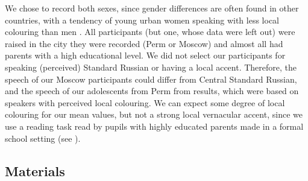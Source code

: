 \documentclass[output=paper,colorlinks,citecolor=black]{langscibook}
\begin{document}
We chose to record both sexes, since gender differences are often found in other countries, with a tendency of young urban women speaking with less local colouring than men \citep{Labov2001}. All participants (but one, whose data were left out) were raised in the city they were recorded (Perm or Moscow) and almost all had parents with a high educational level. We did not select our participants for speaking (perceived) Standard Russian or having a local accent. Therefore, the speech of our Moscow participants could differ from Central Standard Russian, and the speech of our adolescents from Perm from  results, which were based on speakers with perceived local colouring. We can expect some degree of local colouring for our mean values, but not a strong local vernacular accent, since we use a reading task read by pupils with highly educated parents made in a formal school setting (see ).

\subsection{Materials}
\end{document}
